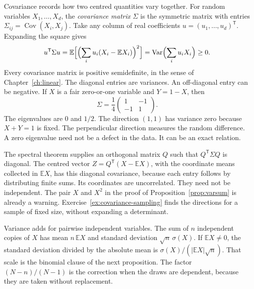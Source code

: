 Covariance records how two centred quantities vary together. For random variables $X_1,\ldots,X_d$, the \emph{covariance matrix} $\Sigma$ is the symmetric matrix with entries $\Sigma_{ij}=\operatorname{Cov}(X_i,X_j)$. Take any column of real coefficients $u=(u_1,\ldots,u_d)^{\mathsf T}$. Expanding the square gives
\[
 u^{\mathsf T}\Sigma u
 =\mathbb E\Bigl[\Bigl(\sum_i u_i(X_i-\mathbb EX_i)\Bigr)^2\Bigr]
 =\operatorname{Var}\Bigl(\sum_i u_i X_i\Bigr)\ge0.
\]
Every covariance matrix is positive semidefinite, in the sense of Chapter~\ref{ch:linear}. The diagonal entries are variances. An off-diagonal entry can be negative. If $X$ is a fair zero-or-one variable and $Y=1-X$, then
\[
 \Sigma=\frac14\begin{pmatrix}1&-1\\-1&1\end{pmatrix}.
\]
The eigenvalues are $0$ and $1/2$. The direction $(1,1)$ has variance zero because $X+Y=1$ is fixed. The perpendicular direction measures the random difference. A zero eigenvalue need not be a defect in the data. It can be an exact relation.

The spectral theorem supplies an orthogonal matrix $Q$ such that $Q^{\mathsf T}\Sigma Q$ is diagonal. The centred vector $Z=Q^{\mathsf T}(X-\mathbb EX)$, with the coordinate means collected in $\mathbb EX$, has this diagonal covariance, because each entry follows by distributing finite sums. Its coordinates are uncorrelated. They need not be independent. The pair $X$ and $X^2$ in the proof of Proposition~\ref{prop:varsum} is already a warning. Exercise~\ref{ex:covariance-sampling} finds the directions for a sample of fixed size, without expanding a determinant.

Variance adds for pairwise independent variables. The sum of $n$ independent copies of $X$ has mean $n\,\mathbb EX$ and standard deviation $\sqrt n\,\sigma(X)$. If $\mathbb EX\ne0$, the standard deviation divided by the absolute mean is $\sigma(X)/(|\mathbb EX|\sqrt n)$. That scale is the binomial clause of the next proposition. The factor $(N-n)/(N-1)$ is the correction when the draws are dependent, because they are taken without replacement.

